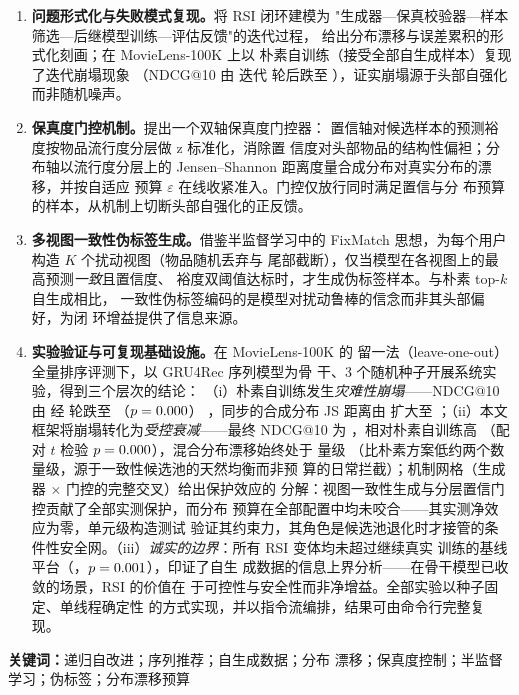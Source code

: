 \begin{enumerate}
\item \textbf{问题形式化与失败模式复现。}将 RSI 闭环建模为
"生成器—保真校验器—样本筛选—后继模型训练—评估反馈"的迭代过程，
给出分布漂移与误差累积的形式化刻画；在 MovieLens-100K 上以
朴素自训练（接受全部自生成样本）复现了迭代崩塌现象
（NDCG@10 由 \ExpNaiveStart{} 迭代 \ExpNaiveRounds{} 轮后跌至
\ExpNaiveEnd{}），证实崩塌源于头部自强化而非随机噪声。
\item \textbf{保真度门控机制。}提出一个双轴保真度门控器：
置信轴对候选样本的预测裕度按物品流行度分层做 z 标准化，消除置
信度对头部物品的结构性偏袒；分布轴以流行度分层上的
Jensen--Shannon 距离度量合成分布对真实分布的漂移，并按自适应
预算 $\varepsilon$ 在线收紧准入。门控仅放行同时满足置信与分
布预算的样本，从机制上切断头部自强化的正反馈。
\item \textbf{多视图一致性伪标签生成。}借鉴半监督学习中的
FixMatch 思想，为每个用户构造 $K$ 个扰动视图（物品随机丢弃与
尾部截断），仅当模型在各视图上的最高预测\emph{一致}且置信度、
裕度双阈值达标时，才生成伪标签样本。与朴素 top-$k$ 自生成相比，
一致性伪标签编码的是模型对扰动鲁棒的信念而非其头部偏好，为闭
环增益提供了信息来源。
\item \textbf{实验验证与可复现基础设施。}在 MovieLens-100K 的
留一法（leave-one-out）全量排序评测下，以 GRU4Rec 序列模型为骨
干、3 个随机种子开展系统实验，得到三个层次的结论：
（i）朴素自训练发生\emph{灾难性崩塌}——NDCG@10 由 \ExpNaiveStart{}
经 \ExpNaiveRounds{} 轮跌至 \ExpNaiveEnd{}（$p=0.000{}$）
，同步的合成分布 JS 距离由 \NaiveJsFirst{} 扩大至 \NaiveJsLast{}
；（ii）本文框架将崩塌转化为\emph{受控衰减}——最终 NDCG@10 为
\ExpOursEnd{}，相对朴素自训练高 \ExpGainText{}（配对 $t$ 检验
$p=0.000{}$），混合分布漂移始终处于 \OursJsRange{} 量级
（比朴素方案低约两个数量级，源于一致性候选池的天然均衡而非预
算的日常拦截）；机制网格（生成器 $\times$ 门控的完整交叉）给出保护效应的
分解：视图一致性生成与分层置信门控贡献了全部实测保护，而分布
预算在全部配置中均未咬合——其实测净效应为零，单元级构造测试
验证其约束力，其角色是候选池退化时才接管的条件性安全网。（iii）\emph{诚实的边界}：所有 RSI 变体均未超过继续真实
训练的基线平台（\BaseNdcg{}，$p=0.001{}$），印证了自生
成数据的信息上界分析——在骨干模型已收敛的场景，RSI 的价值在
于可控性与安全性而非净增益。全部实验以种子固定、单线程确定性
的方式实现，并以指令流编排，结果可由命令行完整复现。
\end{enumerate}

\medskip
\noindent\textbf{关键词：}递归自改进；序列推荐；自生成数据；分布
漂移；保真度控制；半监督学习；伪标签；分布漂移预算

